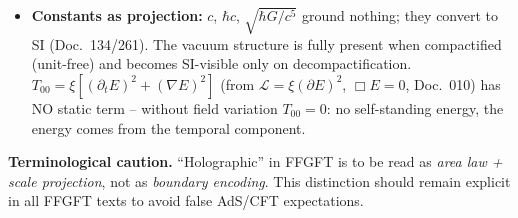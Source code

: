 \begin{itemize}
        $\xi\to E_H=E_0\xi^{41/4}\to R_H=\hbar c/E_H\to H_0=E_H/\hbar$ does exist
        ($\approx 66.2$ km/s/Mpc; Doc.~026/182), with $\hbar c$ as the SI factor.
        $H_0$ is thus a geometric coefficient misread as expansion; the
        model-neutral quantity remains the observable $z(d)$.
        The exponent $41/4$ is calibrated to the measured $H_0$, not derived
        from $\xi$.
  \item \textbf{Constants as projection:} $c$, $\hbar c$, $\sqrt{\hbar G/c^5}$
        ground nothing; they convert to SI (Doc.~134/261). The vacuum structure
        is fully present when compactified (unit-free) and becomes SI-visible
        only on decompactification. $T_{00}=\xi[(\partial_t E)^2+(\nabla E)^2]$
        (from $\mathcal{L}=\xi(\partial E)^2$, $\Box E=0$, Doc.~010) has NO static
        term -- without field variation $T_{00}=0$: no self-standing energy,
        the energy comes from the temporal component.
\end{itemize}

\noindent
\textbf{Terminological caution.} \enquote{Holographic} in FFGFT is to be read
as \emph{area law + scale projection}, not as \emph{boundary encoding}. This
distinction should remain explicit in all FFGFT texts to avoid false AdS/CFT
expectations.
